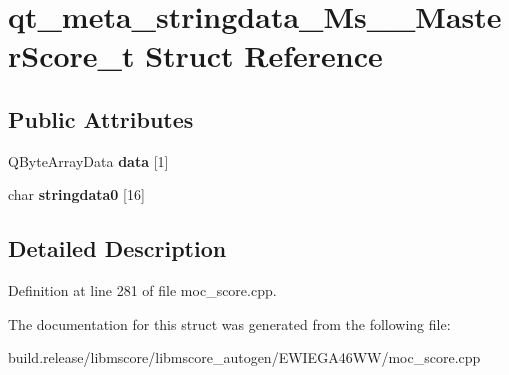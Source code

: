 \hypertarget{structqt__meta__stringdata___ms_____master_score__t}{}\section{qt\+\_\+meta\+\_\+stringdata\+\_\+\+Ms\+\_\+\+\_\+\+Master\+Score\+\_\+t Struct Reference}
\label{structqt__meta__stringdata___ms_____master_score__t}
\subsection*{Public Attributes}
\begin{DoxyCompactItemize}
\item 
\mbox{\label{structqt__meta__stringdata___ms_____master_score__t_a09f906735edfd7360cf978e40c79e229}} 
Q\+Byte\+Array\+Data {\bfseries data} \mbox{[}1\mbox{]}
\item 
\mbox{\label{structqt__meta__stringdata___ms_____master_score__t_a934bc2621ca8664e769bdb298bcf48f3}} 
char {\bfseries stringdata0} \mbox{[}16\mbox{]}
\end{DoxyCompactItemize}


\subsection{Detailed Description}


Definition at line 281 of file moc\+\_\+score.\+cpp.



The documentation for this struct was generated from the following file\+:\begin{DoxyCompactItemize}
\item 
build.\+release/libmscore/libmscore\+\_\+autogen/\+E\+W\+I\+E\+G\+A46\+W\+W/moc\+\_\+score.\+cpp\end{DoxyCompactItemize}
